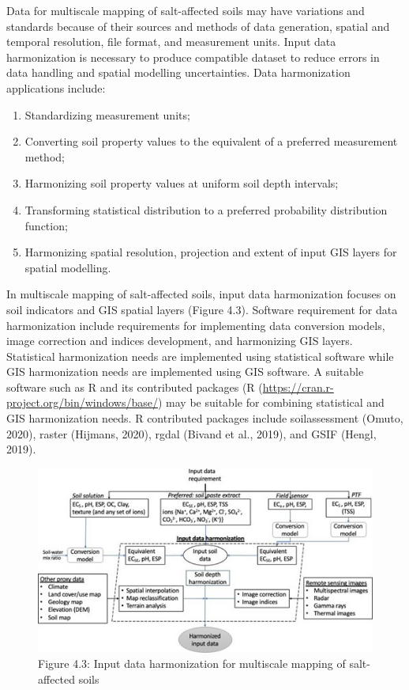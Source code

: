 \documentclass[
  10pt,
  b5paper,
]{book}
\providecommand{\tightlist}{%
  \setlength{\itemsep}{0pt}\setlength{\parskip}{0pt}}
\begin{document}
Data for multiscale mapping of salt-affected soils may have variations and standards because of their sources and methods of data generation, spatial and temporal resolution, file format, and measurement units. Input data harmonization is necessary to produce compatible dataset to reduce errors in data handling and spatial modelling uncertainties. Data harmonization applications include:

\begin{enumerate}
\def\labelenumi{\alph{enumi})}
\tightlist
\item
  Standardizing measurement units;\\
\item
  Converting soil property values to the equivalent of a preferred measurement method;\\
\item
  Harmonizing soil property values at uniform soil depth intervals;\\
\item
  Transforming statistical distribution to a preferred probability distribution function;\\
\item
  Harmonizing spatial resolution, projection and extent of input GIS layers for spatial modelling.
\end{enumerate}

In multiscale mapping of salt-affected soils, input data harmonization focuses on soil indicators and GIS spatial layers (Figure 4.3). Software requirement for data harmonization include requirements for implementing data conversion models, image correction and indices development, and harmonizing GIS layers. Statistical harmonization needs are implemented using statistical software while GIS harmonization needs are implemented using GIS software. A suitable software such as R and its contributed packages (R (\url{https://cran.r-project.org/bin/windows/base/}) may be suitable for combining statistical and GIS harmonization needs. R contributed packages include soilassessment (Omuto, 2020), raster (Hijmans, 2020), rgdal (Bivand et al., 2019), and GSIF (Hengl, 2019).

\begin{figure}
\centering
\includegraphics{figures/images/Figure4.3.jpg}
\caption{Figure 4.3: Input data harmonization for multiscale mapping of salt-affected soils}
\end{figure}
\end{document}
